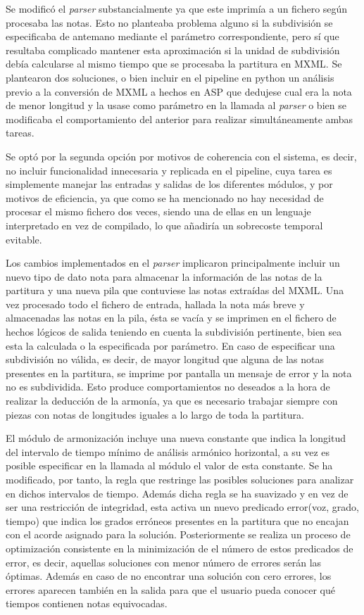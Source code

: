 Se modificó el \textit{parser} substancialmente ya que este imprimía a un fichero según procesaba las notas. Esto no planteaba problema alguno si la subdivisión se especificaba de antemano mediante el parámetro correspondiente, pero sí que resultaba complicado mantener esta aproximación si la unidad de subdivisión debía calcularse al mismo tiempo que se procesaba la partitura en MXML. Se plantearon dos soluciones, o bien incluir en el pipeline en python un análisis previo a la conversión de MXML a hechos en ASP que dedujese cual era la nota de menor longitud y la usase como parámetro en la llamada al \textit{parser} o bien se modificaba el comportamiento del anterior para realizar simultáneamente ambas tareas. 

Se optó por la segunda opción por motivos de coherencia con el sistema, es decir, no incluir funcionalidad innecesaria y replicada en el pipeline, cuya tarea es simplemente manejar las entradas y salidas de los diferentes módulos, y por motivos de eficiencia, ya que como se ha mencionado no hay necesidad de procesar el mismo fichero dos veces, siendo una de ellas en un lenguaje interpretado en vez de compilado, lo que añadiría un sobrecoste temporal evitable.

Los cambios implementados en el \textit{parser} implicaron principalmente incluir un nuevo tipo de dato nota para almacenar la información de las notas de la partitura y una nueva pila que contuviese las notas extraídas del MXML. Una vez procesado todo el fichero de entrada, hallada la nota más breve y almacenadas las notas en la pila, ésta se vacía y se imprimen en el fichero de hechos lógicos de salida teniendo en cuenta la subdivisión pertinente, bien sea esta la calculada o la especificada por parámetro. En caso de especificar una subdivisión no válida, es decir, de mayor longitud que alguna de las notas presentes en la partitura, se imprime por pantalla un mensaje de error y la nota no es subdividida. Esto produce comportamientos no deseados a la hora de realizar la deducción de la armonía, ya que es necesario trabajar siempre con piezas con notas de longitudes iguales a lo largo de toda la partitura.

El módulo de armonización incluye una nueva constante que indica la longitud del intervalo de tiempo mínimo de análisis armónico horizontal, a su vez es posible especificar en la llamada al módulo el valor de esta constante. Se ha modificado, por tanto, la regla que restringe las posibles soluciones para analizar en dichos intervalos de tiempo. Además dicha regla se ha suavizado y en vez de ser una restricción de integridad, esta activa un nuevo predicado error(voz, grado, tiempo) que indica los grados erróneos presentes en la partitura que no encajan con el acorde asignado para la solución. Posteriormente se realiza un proceso de optimización consistente en la minimización de el número de estos predicados de error, es decir, aquellas soluciones con menor número de errores serán las óptimas. Además en caso de no encontrar una solución con cero errores, los errores aparecen también en la salida para que el usuario pueda conocer qué tiempos contienen notas equivocadas.

